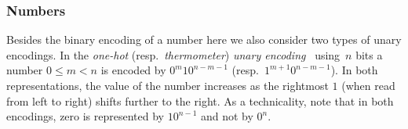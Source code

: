 \subsubsection{Numbers}
\label{prelim:sec:enc-numbers}

 
Besides the binary encoding of a number here we also consider
two types of unary encodings.
In the \emph{one-hot} (resp.~\emph{thermometer}) \emph{unary encoding}~\cite{DBLP:journals/trets/Mohajer0BL20} using~$n$ bits a number $0 \le m < n$
is encoded by $0^{m} 1 0^{n - m - 1}$ (resp.~$1^{m+1} 0^{n - m - 1}$). In both representations, the value of the number increases 
as the rightmost $1$ (when read from left to right) shifts further to the right.
As a technicality, note that in both encodings, zero is represented by $10^{n-1}$ and not by $0^n$.


